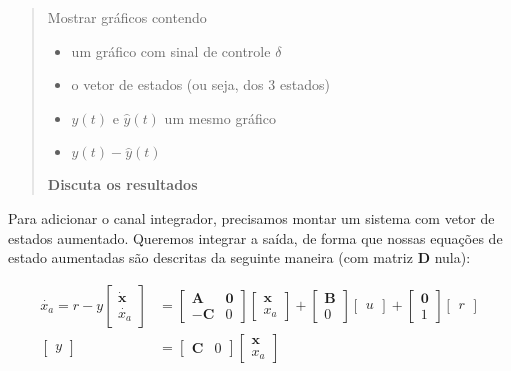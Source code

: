 \documentclass[13pt]{article}
\newcommand{\vect}[1]{\mathbf{#1}} %
\newcommand{\matr}[1]{\mathbf{#1}} %
\begin{document}
\begin{quote}
Mostrar gráficos contendo
\begin{itemize}
\item um gráfico com sinal de controle \(\delta\)
\item o vetor de estados (ou seja, dos 3 estados)
\item \(y(t)\) e \(\hat{y}(t)\) um mesmo gráfico
\item \(y(t) - \hat{y}(t)\)
\end{itemize}

\textbf{Discuta os resultados}
\end{quote}

Para adicionar o canal integrador, precisamos montar um sistema com vetor de estados aumentado. Queremos integrar a saída, de forma que nossas equações de estado aumentadas são descritas da seguinte maneira (com matriz \(\matr{D}\) nula):

\addtolength{\jot}{1em}
\begin{align*}
    \dot{x_a} = r - y
    \begin{bmatrix} \dot{\vect{x}} \\ \dot{x_a} \end{bmatrix}
    &=
    \begin{bmatrix}
    \matr{A} & \matr{0} \\
    -\matr{C} & 0
    \end{bmatrix}
    \begin{bmatrix} {\vect{x}} \\ x_a \end{bmatrix}
    +
    \begin{bmatrix} {\matr{B}} \\ 0 \end{bmatrix}
    \begin{bmatrix} u \end{bmatrix}
    +
    \begin{bmatrix} {\matr{0}} \\ 1 \end{bmatrix}
    \begin{bmatrix} r \end{bmatrix}
    \\
    \begin{bmatrix} y \end{bmatrix}
    &=
    \begin{bmatrix}
    \matr{C} & 0
    \end{bmatrix}
    \begin{bmatrix} {\vect{x}} \\ x_a \end{bmatrix}
\end{align*}
\end{document}
